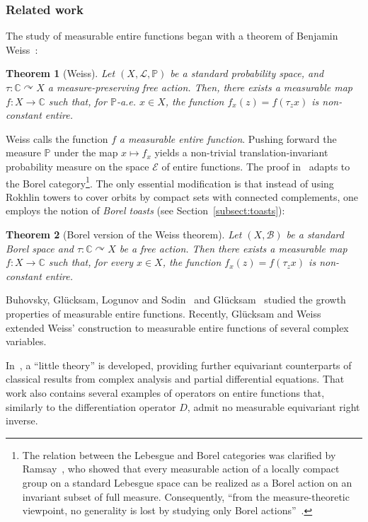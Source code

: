 \documentclass[11pt]{paper}
\newtheorem*{theorem*}{Theorem}
\newcommand{\bC}{\mathbb C}
\newcommand{\bP}{\mathbb P}
\newcommand{\cE}{\mathcal E}
\begin{document}
\subsubsection*{Related work}
The study of measurable entire functions began with a theorem of Benjamin Weiss~\cite{Weiss}:
\begin{theorem*}[Weiss]
Let $(X, \mathscr L, \bP)$ be a standard probability space, and $\tau\colon \bC\curvearrowright X$
a measure-preserving free action. Then, there exists a measurable map
$f\colon X\to \bC$  such that, for $\bP$-a.e. $x\in X$, the function $f_x (z) =  f(\tau_z x)$
is non-constant entire.
\end{theorem*}
\noindent Weiss calls the function $f$ {\em a measurable entire function}. Pushing forward the measure $\bP$
under the map $x \mapsto f_x$ yields a non-trivial translation-invariant probability measure on the
space $\cE$ of entire functions.
The proof in~\cite{Weiss} adapts to the Borel category\footnote{
The relation between the Lebesgue and Borel categories was clarified by Ramsay~\cite{Ramsey}, who
showed that every measurable action of a locally compact group on a standard Lebesgue space can be realized
as a Borel action on an invariant subset of full measure. Consequently, “from the measure-theoretic
viewpoint, no generality is lost by studying only Borel actions”~\cite[p.~340]{Ramsey}.
}.
The only essential modification is that  instead of using Rokhlin towers to cover orbits by compact sets with
connected complements, one employs the notion of {\em Borel toasts} (see Section~\ref{subsect:toasts}):
\begin{theorem*}[Borel version of the Weiss theorem]
Let $(X, \mathscr B)$ be a standard Borel space and $\tau\colon \bC\curvearrowright X$ be
a free action. Then there exists a measurable map  $f\colon X\to \bC$  such that, for every $x\in X$,
the function $f_x (z) =  f(\tau_z x)$ is non-constant entire.
\end{theorem*}

Buhovsky, Gl\"ucksam, Logunov and Sodin~\cite{BGLS} and  Gl\"ucksam~\cite{Glucksam}
studied the growth properties of measurable entire functions. Recently, Gl\"ucksam and Weiss~\cite{GW} extended Weiss’ construction to measurable entire functions of several complex variables.

\smallskip
In~\cite{SSW}, a “little theory” is developed, providing further equivariant counterparts of classical
results from complex analysis and partial differential equations. That work also contains several examples
of operators on entire functions that, similarly to the differentiation operator $D$, admit no measurable equivariant right inverse.
\end{document}
